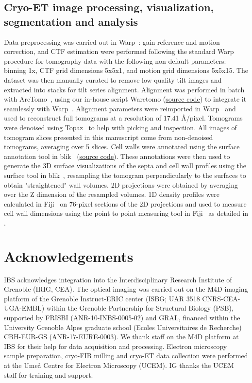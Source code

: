 \subsection{Cryo-ET image processing, visualization, segmentation and analysis}
Data preprocessing was carried out in Warp~\cite{tegunovRealtimeCryoelectronMicroscopy2019}: gain reference and motion correction, and CTF estimation were performed following the standard Warp~\cite{tegunovRealtimeCryoelectronMicroscopy2019} procedure for tomography data with the following non-default parameters: binning 1x, CTF grid dimensions 5x5x1, and motion grid dimensions 5x5x15.
The dataset was then manually curated to remove low quality tilt images and extracted into stacks for tilt series alignment.
Alignment was performed in batch with AreTomo~\cite{zhengAreTomoIntegratedSoftware2022}, using our in-house script Waretomo (\href{https://doi.org/10.5281/zenodo.13350542}{source code}) to integrate it seamlessly with Warp~\cite{tegunovRealtimeCryoelectronMicroscopy2019}.
Alignment parameters were reimported in Warp~\cite{tegunovRealtimeCryoelectronMicroscopy2019} and used to reconstruct full tomograms at a resolution of 17.41 Å/pixel.
Tomograms were denoised using Topaz~\cite{beplerTopazDenoiseGeneralDeep2020} to help with picking and inspection.
All images of tomogram slices presented in this manuscript come from non-denoised tomograms, averaging over 5 slices.
Cell walls were annotated using the surface annotation tool in blik~\cite{gaifasBlikExtensible3D2024} (\href{https://zenodo.org/records/10894490}{source code}).
These annotations were then used to generate the 3D surface visualizations of the septa and cell wall profiles using the surface tool in blik~\cite{gaifasBlikExtensible3D2024}, resampling the tomogram perpendicularly to the surfaces to obtain "straightened" wall volumes.
2D projections were obtained by averaging over the Z dimension of the resampled volumes.
1D density profiles were calculated in Fiji~\cite{schindelinFijiOpensourcePlatform2012} on 76-pixel sections of the 2D projections and used to measure cell wall dimensions using the point to point measuring tool in Fiji~\cite{schindelinFijiOpensourcePlatform2012} as detailed in .

\section{Acknowledgements}
IBS acknowledges integration into the Interdisciplinary Research Institute of Grenoble (IRIG, CEA).
The optical imaging was carried out on the M4D imaging platform of the Grenoble Instruct-ERIC center (ISBG; UAR 3518 CNRS-CEA-UGA-EMBL) within the Grenoble Partnership for Structural Biology (PSB), supported by FRISBI (ANR-10-INBS-0005-02) and GRAL, financed within the University Grenoble Alpes graduate school (Ecoles Universitaires de Recherche) CBH-EUR-GS (ANR-17-EURE-0003).
We thank staff on the M4D platform at IBS for their help for data acquisition and processing.
Electron microscopy sample preparation, cryo-FIB milling and cryo-ET data collection were performed at the Umeå Centre for Electron Microscopy (UCEM).
IG thanks the UCEM staff for training and support.

